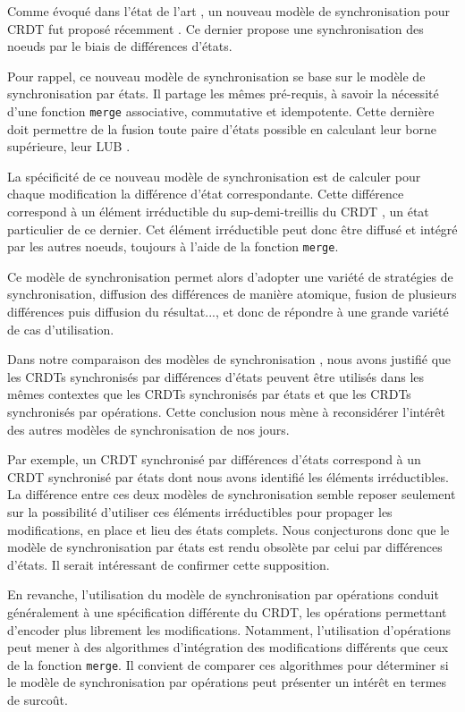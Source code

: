 Comme évoqué dans l'état de l'art , un nouveau modèle de synchronisation pour \ac{CRDT} fut proposé récemment \cite{almeida2015delta}.
Ce dernier propose une synchronisation des noeuds par le biais de différences d'états.

Pour rappel, ce nouveau modèle de synchronisation se base sur le modèle de synchronisation par états.
Il partage les mêmes pré-requis, à savoir la nécessité d'une fonction \texttt{merge} associative, commutative et idempotente.
Cette dernière doit permettre de la fusion toute paire d'états possible en calculant leur borne supérieure, \ie leur \ac{LUB} \cite{2018-crdts-perguica-baquero-shapiro}.

La spécificité de ce nouveau modèle de synchronisation est de calculer pour chaque modification la différence d'état correspondante.
Cette différence correspond à un élément irréductible du sup-demi-treillis du \ac{CRDT} \cite{enes2019}, \ie un état particulier de ce dernier.
Cet élément irréductible peut donc être diffusé et intégré par les autres noeuds, toujours à l'aide de la fonction \texttt{merge}.

Ce modèle de synchronisation permet alors d'adopter une variété de stratégies de synchronisation, \eg diffusion des différences de manière atomique, fusion de plusieurs différences puis diffusion du résultat..., et donc de répondre à une grande variété de cas d'utilisation.

Dans notre comparaison des modèles de synchronisation , nous avons justifié que les \acp{CRDT} synchronisés par différences d'états peuvent être utilisés dans les mêmes contextes que les \acp{CRDT} synchronisés par états et que les \acp{CRDT} synchronisés par opérations.
Cette conclusion nous mène à reconsidérer l'intérêt des autres modèles de synchronisation de nos jours.

Par exemple, un \ac{CRDT} synchronisé par différences d'états correspond à un \ac{CRDT} synchronisé par états dont nous avons identifié les éléments irréductibles.
La différence entre ces deux modèles de synchronisation semble reposer seulement sur la possibilité d'utiliser ces éléments irréductibles pour propager les modifications, en place et lieu des états complets.
Nous conjecturons donc que le modèle de synchronisation par états est rendu obsolète par celui par différences d'états.
Il serait intéressant de confirmer cette supposition.

En revanche, l'utilisation du modèle de synchronisation par opérations conduit généralement à une spécification différente du \ac{CRDT}, les opérations permettant d'encoder plus librement les modifications.
Notamment, l'utilisation d'opérations peut mener à des algorithmes d'intégration des modifications différents que ceux de la fonction \texttt{merge}.
Il convient de comparer ces algorithmes pour déterminer si le modèle de synchronisation par opérations peut présenter un intérêt en termes de surcoût.

